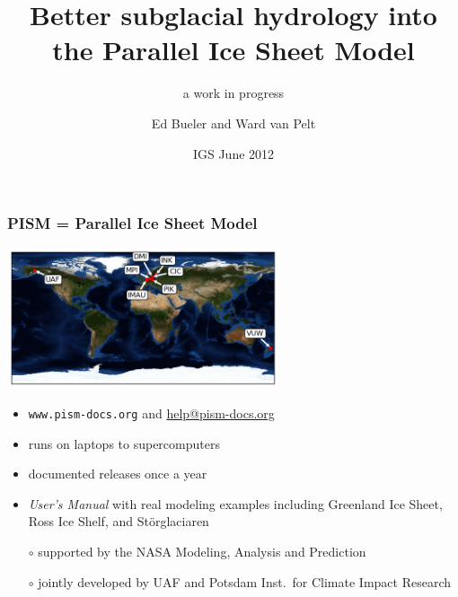 \documentclass[hide notes,intlimits]{beamer}
\title[Better subglacial hydrology into PISM]{Better subglacial hydrology into \\ the Parallel Ice Sheet Model}
\subtitle{a work in progress}
\author[Bueler \and van Pelt]{Ed Bueler\inst{*} and Ward van Pelt\inst{\dagger}}
\institute{\inst{*} University of Alaska Fairbanks \and %
           \inst{\dagger} IMAU, Utrecht, Netherlands}
\date{IGS June 2012}
\begin{document}
{
}

\begin{frame}
  \titlepage
\end{frame}


\newcommand{\scream}[1]{\alert{\textbf{#1}}}

\begin{frame}
  \frametitle{PISM = Parallel Ice Sheet Model}

  \begin{center}
      \includegraphics[width=80mm]{pism-users-map}
  \end{center}

\vspace{-2mm}
  \begin{itemize}
  \item \alert{\large\texttt{www.pism-docs.org}}  and  \url{help@pism-docs.org}
  \item runs on laptops to supercomputers
  \item documented releases once a year
  \item \emph{User's Manual} with real modeling examples including Greenland Ice Sheet, Ross Ice Shelf, and St\"orglaciaren
  
  \bigskip
  \scriptsize
  \item[$\circ$] supported by the NASA Modeling, Analysis and Prediction
  \item[$\circ$] jointly developed by UAF and Potsdam Inst.~for Climate Impact Research
  \end{itemize}
\end{frame}


\newcommand{\whytitle}{why we need better subglacial hydrology}
\end{document}
